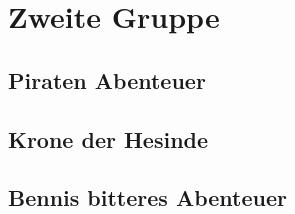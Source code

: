 \chapter{Zweite Gruppe}
\section{Piraten Abenteuer}
\section{Krone der Hesinde}
\section{Bennis bitteres Abenteuer}